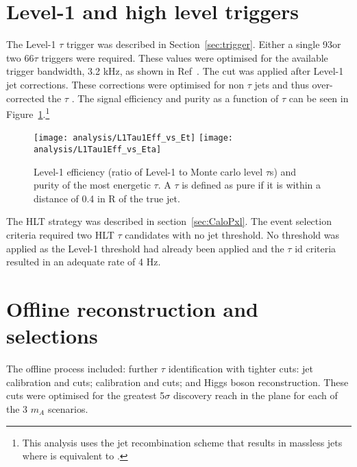

\section{Level-1 and high level triggers}
The Level-1 $\tau$ trigger was described in Section~\ref{sec:trigger}. Either a single 93\GeV or two 66\GeV $\tau$ triggers were required. These values were optimised for the available trigger bandwidth, 3.2 kHz, as shown in Ref~\cite{CMS_TDR_PHYS_vol1}. The \ET cut was applied after Level-1 jet corrections. These corrections were optimised for non $\tau$ jets and thus over-corrected the $\tau$ \ET. The signal efficiency and purity as a function of $\tau$ \ET can be seen in Figure~\ref{fig:L1_eff_purity}.\footnote{This analysis uses the \ET jet recombination scheme that results in massless jets where \PT is equivalent to \ET.}

\begin{figure}[tb]
\centering
\texttt{[image: analysis/L1Tau1Eff\_vs\_Et]}
\texttt{[image: analysis/L1Tau1Eff\_vs\_Eta]}
\caption{Level-1 efficiency (ratio of Level-1 to Monte carlo level $\tau$s) and purity of the most energetic $\tau$. A $\tau$ is defined as pure if it is within a distance of 0.4 in R of the true jet.   
\label{fig:L1_eff_purity}}
\end{figure}

The HLT strategy was described in section~\ref{sec:CaloPxl}. The event selection criteria required two HLT $\tau$ candidates with no jet \ET threshold. No \ET threshold was applied as the Level-1 threshold had already been applied and the $\tau$ id criteria resulted in an adequate rate of 4 Hz.

\section{Offline reconstruction and selections}
The offline process included: further $\tau$ identification with tighter cuts: jet calibration and cuts; \MET calibration and cuts; and Higgs boson reconstruction. These cuts were optimised for the greatest 5$\sigma$ discovery reach in the \plane plane for each of the 3 $m_A$ scenarios. 

